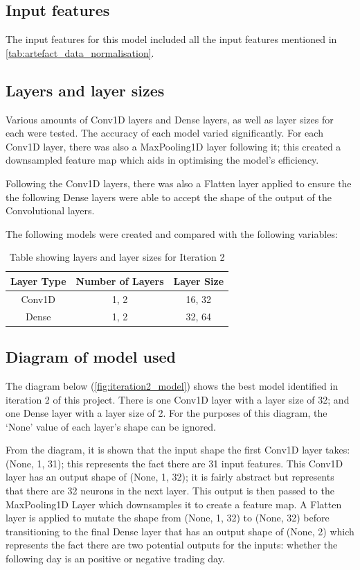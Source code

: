 \subsection{Input features}
The input features for this model included all the input features mentioned in \autoref{tab:artefact_data_normalisation}.

\subsection{Layers and layer sizes} \label{ssec:iteration2layers}
Various amounts of Conv1D layers and Dense layers, as well as layer sizes for each were tested. The accuracy of each model varied
significantly. For each Conv1D layer, there was also a MaxPooling1D layer following it; this created a downsampled
feature map which aids in optimising the model's efficiency.

Following the Conv1D layers, there was also a Flatten layer applied to ensure the the following Dense layers
were able to accept the shape of the output of the Convolutional layers.

The following models were created and compared with the following variables:

\begin{table}[ht]
    \centering
    \begin{tabular}{|c|c|c|}
        \hline
        Layer Type & Number of Layers & Layer Size \\
        \hline\hline
        Conv1D & 1, 2 & 16, 32 \\
        Dense & 1, 2 & 32, 64 \\
        \hline
    \end{tabular}
    \caption{Table showing layers and layer sizes for Iteration 2}
    \label{tab:iteration2_layers}
\end{table}
\FloatBarrier

\subsection{Diagram of model used}
The diagram below (\autoref{fig:iteration2_model}) shows the best model identified in iteration 2 of this project.
There is one Conv1D layer with a layer size of 32; and one Dense layer with a layer size of 2.
For the purposes of this diagram, the `None' value of each layer's shape can be ignored.

From the diagram, it is shown that the input shape the first Conv1D layer takes: (None, 1, 31); this represents the
fact there are 31 input features.  This Conv1D layer has an output shape of (None, 1, 32); it is fairly abstract
but represents that there are 32 neurons in the next layer. This output is then passed to the MaxPooling1D Layer
which downsamples it to create a feature map. A Flatten layer is applied to mutate the shape from (None, 1, 32) to
(None, 32) before transitioning to the final Dense layer that has an output shape of (None, 2)
which represents the fact there are two potential outputs for the inputs: whether the following day
is an positive or negative trading day.

